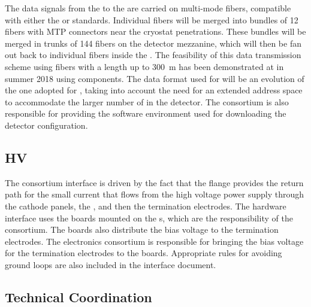 The data signals from the  to the  are carried on
multi-mode fibers, compatible with either the  or  standards. Individual
fibers will be merged into bundles of 12 fibers with MTP connectors near the 
 cryostat penetrations. These bundles will be merged in trunks of 144 
fibers on the detector mezzanine, which will then be fan out back to individual
fibers inside the . The
feasibility of this data transmission scheme using fibers with a length up
to \SI{300}{m} has been demonstrated at  in summer 2018 using 
 components. The data format used for 
 will be an evolution of the one adopted for
, taking into account the need for an 
extended address space to accommodate the larger number of
 in the detector. The  consortium
is also responsible for providing the software environment
used for downloading the detector configuration.

\subsection{HV}
\label{sec:fdsp-tpcelec-interfaces-hv}

The  consortium interface 
is driven by the fact that the  flange provides the return path for
the small current that flows from the high voltage power 
supply through the cathode panels, the , and then
the termination electrodes. The hardware interface uses
the  boards mounted on the s, which
are  the responsibility of the  consortium. The
 boards also distribute the bias voltage to the 
 termination electrodes. The  electronics 
consortium is responsible for bringing the bias voltage for the 
 termination electrodes to the  boards. Appropriate
rules for avoiding ground loops are also included in the 
interface document.

\subsection{Technical Coordination}
\label{sec:fdsp-tpcelec-interfaces-tc}

